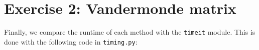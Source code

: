 \section{Exercise 2: Vandermonde matrix}

Finally, we compare the runtime of each method with the \texttt{timeit} module. This is done with the following code in \texttt{timing.py}: